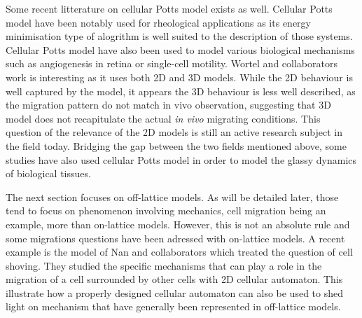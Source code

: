 \documentclass[11pt,a4paper]{article}
\begin{document}

Some recent litterature on cellular Potts model exists as well. Cellular Potts model have been notably used for rheological applications as its energy minimisation type of alogrithm is well suited to the description of those systems.\cite{Villemot2021}\cite{Xu2021} Cellular Potts model have also been used to model various biological mechanisms such as angiogenesis in retina\cite{Vega2021} or single-cell motility.\cite{Wortel2021} Wortel and collaborators work is interesting as it uses both 2D and 3D models. While the 2D behaviour is well captured by the model, it appears the 3D behaviour is less well described, as the migration pattern do not match in vivo observation, suggesting that 3D model does not recapitulate the actual \textit{in vivo} migrating conditions. This question of the relevance of the 2D models is still an active research subject in the field today. Bridging the gap between the two fields mentioned above, some studies have also used cellular Potts model in order to model the glassy dynamics of biological tissues.\cite{Czajkowski2019}\cite{Sadhukhan2021} 

The next section focuses on off-lattice models. As will be detailed later, those tend to focus on phenomenon involving mechanics, cell migration being an example, more than on-lattice models. However, this is not an absolute rule and some migrations questions have been adressed with on-lattice models. A recent example is the model of Nan and collaborators which treated the question of cell shoving.\cite{Nan2018} They studied the specific mechanisms that can play a role in the migration of a cell surrounded by other cells with 2D cellular automaton. This illustrate how a properly designed cellular automaton can also be used to shed light on mechanism that have generally been represented in off-lattice models.
\end{document}
